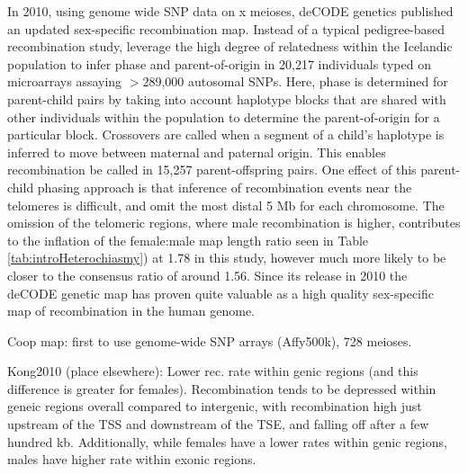 In 2010, using genome wide SNP data on x meioses, deCODE genetics published an updated sex-specific recombination map\cite{Kong2010}.
Instead of a typical pedigree-based recombination study, \citet{Kong2010} leverage the high degree of relatedness within the Icelandic population to infer phase and parent-of-origin in 20,217 individuals typed on microarrays assaying $>$289,000 autosomal SNPs.
Here, phase is determined for parent-child pairs by taking into account haplotype blocks that are shared with other individuals within the population to determine the parent-of-origin for a particular block.
Crossovers are called when a segment of a child's haplotype is inferred to move between maternal and paternal origin.
This enables recombination be called in 15,257 parent-offspring pairs.
One effect of this parent-child phasing approach is that inference of recombination events near the telomeres is difficult, and \citet{Kong2010} omit the most distal 5 Mb for each chromosome.
The omission of the telomeric regions, where male recombination is higher, contributes to the inflation of the female:male map length ratio seen in Table \ref{tab:introHeterochiasmy}) at 1.78 in this study, however much more likely to be closer to the consensus ratio of around 1.56.
Since its release in 2010 the deCODE genetic map has proven quite valuable as a high quality sex-specific map of recombination in the human genome.

Coop map: first to use genome-wide SNP arrays (Affy500k), 728 meioses.

Kong2010 (place elsewhere):
Lower rec. rate within genic regions (and this difference is greater for females).
Recombination tends to be depressed within geneic regions overall compared to intergenic, with recombination high just upstream of the TSS and downstream of the TSE, and falling off after a few hundred kb\cite{Kong2010,Coop2008}.
Additionally, while females have a lower rates within genic regions, males have higher rate within exonic regions.







